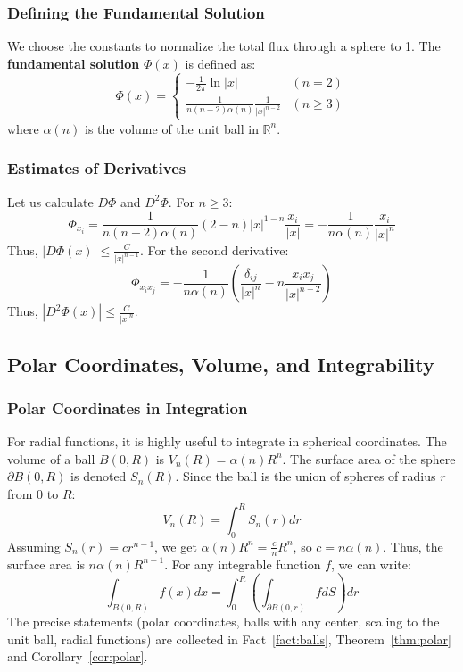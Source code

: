 \documentclass[11pt]{article}
\theoremstyle{plain}
\theoremstyle{definition}
\theoremstyle{remark}
\begin{document}
\subsubsection{Defining the Fundamental Solution}
We choose the constants to normalize the total flux through a sphere to 1. The \textbf{fundamental solution} $\Phi(x)$ is defined as:
$$
\Phi(x) = \begin{cases}
-\frac{1}{2\pi} \ln |x| & (n=2) \\
\frac{1}{n(n-2)\alpha(n)} \frac{1}{|x|^{n-2}} & (n \geq 3)
\end{cases}
$$
where $\alpha(n)$ is the volume of the unit ball in $\mathbb{R}^n$.

\subsubsection{Estimates of Derivatives}
Let us calculate $D\Phi$ and $D^2\Phi$.
For $n \geq 3$:
$$ \Phi_{x_i} = \frac{1}{n(n-2)\alpha(n)} (2-n) |x|^{1-n} \frac{x_i}{|x|} = -\frac{1}{n\alpha(n)} \frac{x_i}{|x|^n} $$
Thus, $|D\Phi(x)| \leq \frac{C}{|x|^{n-1}}$.
For the second derivative:
$$ \Phi_{x_i x_j} = -\frac{1}{n\alpha(n)} \left( \frac{\delta_{ij}}{|x|^n} - n \frac{x_i x_j}{|x|^{n+2}} \right) $$
Thus, $|D^2\Phi(x)| \leq \frac{C}{|x|^n}$.

\subsection{Polar Coordinates, Volume, and Integrability}
\subsubsection{Polar Coordinates in Integration}
For radial functions, it is highly useful to integrate in spherical coordinates. The volume of a ball $B(0, R)$ is $V_n(R) = \alpha(n) R^n$. 
The surface area of the sphere $\partial B(0, R)$ is denoted $S_n(R)$. Since the ball is the union of spheres of radius $r$ from $0$ to $R$:
$$ V_n(R) = \int_0^R S_n(r) dr $$
Assuming $S_n(r) = c r^{n-1}$, we get $\alpha(n) R^n = \frac{c}{n} R^n$, so $c = n \alpha(n)$.
Thus, the surface area is $n \alpha(n) R^{n-1}$.
For any integrable function $f$, we can write:
$$ \int_{B(0,R)} f(x) dx = \int_0^R \left( \int_{\partial B(0,r)} f dS \right) dr $$
The precise statements (polar coordinates, balls with any center, scaling to the unit ball, radial functions) are collected in Fact~\ref{fact:balls}, Theorem~\ref{thm:polar} and Corollary~\ref{cor:polar}.
\end{document}
